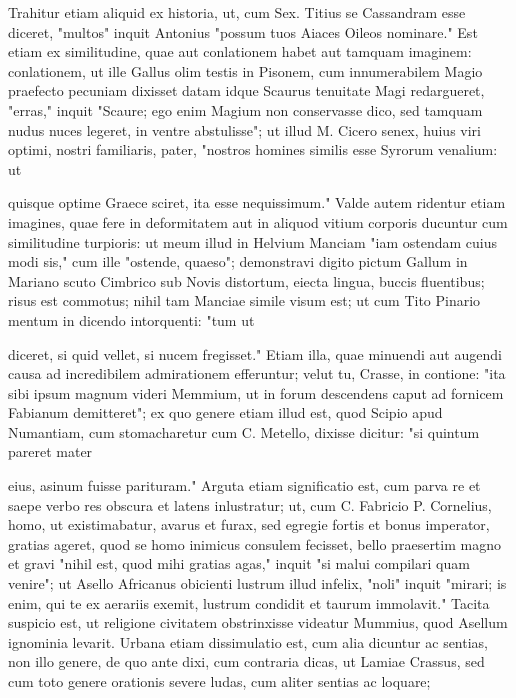  Trahitur etiam aliquid ex historia, ut, cum Sex. Titius se Cassandram esse diceret, "multos" inquit Antonius "possum tuos Aiaces Oileos nominare." Est etiam ex similitudine, quae aut conlationem habet aut tamquam imaginem: conlationem, ut ille Gallus olim testis in Pisonem, cum innumerabilem Magio praefecto pecuniam dixisset datam idque Scaurus tenuitate Magi redargueret, "erras," inquit "Scaure; ego enim Magium non conservasse dico, sed tamquam nudus nuces legeret, in ventre abstulisse"; ut illud M. Cicero senex, huius viri optimi, nostri familiaris, pater, "nostros homines similis esse Syrorum venalium: ut

 quisque optime Graece sciret, ita esse nequissimum." Valde autem ridentur etiam imagines, quae fere in deformitatem aut in aliquod vitium corporis ducuntur cum similitudine turpioris: ut meum illud in Helvium Manciam "iam ostendam cuius modi sis," cum ille "ostende, quaeso"; demonstravi digito pictum Gallum in Mariano scuto Cimbrico sub Novis distortum, eiecta lingua, buccis fluentibus; risus est commotus; nihil tam Manciae simile visum est; ut cum Tito Pinario mentum in dicendo intorquenti: "tum ut

 diceret, si quid vellet, si nucem fregisset." Etiam illa, quae minuendi aut augendi causa ad incredibilem admirationem efferuntur; velut tu, Crasse, in contione: "ita sibi ipsum magnum videri Memmium, ut in forum descendens caput ad fornicem Fabianum demitteret"; ex quo genere etiam illud est, quod Scipio apud Numantiam, cum stomacharetur cum C. Metello, dixisse dicitur: "si quintum pareret mater

 eius, asinum fuisse parituram." Arguta etiam significatio est, cum parva re et saepe verbo res obscura et latens inlustratur; ut, cum C. Fabricio P. Cornelius, homo, ut existimabatur, avarus et furax, sed egregie fortis et bonus imperator, gratias ageret, quod se homo inimicus consulem fecisset, bello praesertim magno et gravi "nihil est, quod mihi gratias agas," inquit "si malui compilari quam venire"; ut Asello Africanus obicienti lustrum illud infelix, "noli" inquit "mirari; is enim, qui te ex aerariis exemit, lustrum condidit et taurum immolavit." Tacita suspicio est, ut religione civitatem obstrinxisse videatur Mummius, quod Asellum ignominia levarit. Urbana etiam dissimulatio est, cum alia dicuntur ac sentias, non illo genere, de quo ante dixi, cum contraria dicas, ut Lamiae Crassus, sed cum toto genere orationis severe ludas, cum aliter sentias ac loquare;

